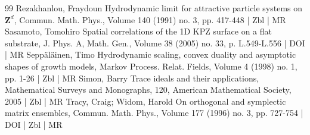 \begin{thebibliography}{99}
Rezakhanlou, Fraydoun Hydrodynamic limit for attractive particle systems on $\mathbf{Z}^d$, Commun. Math. Phys., Volume 140 (1991) no. 3, pp. 417-448 | Zbl | MR
Sasamoto, Tomohiro Spatial correlations of the 1D KPZ surface on a flat substrate, J. Phys. A, Math. Gen., Volume 38 (2005) no. 33, p. L.549-L.556 | DOI | MR
Seppäläinen, Timo Hydrodynamic scaling, convex duality and asymptotic shapes of growth models, Markov Process. Relat. Fields, Volume 4 (1998) no. 1, pp. 1-26 | Zbl | MR
Simon, Barry Trace ideals and their applications, Mathematical Surveys and Monographs, 120, American Mathematical Society, 2005 | Zbl | MR
Tracy, Craig; Widom, Harold On orthogonal and symplectic matrix ensembles, Commun. Math. Phys., Volume 177 (1996) no. 3, pp. 727-754 | DOI | Zbl | MR
\end{thebibliography}
